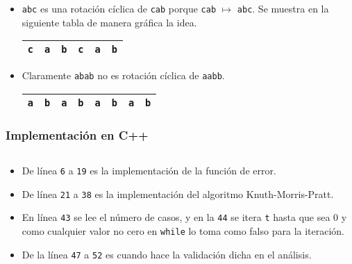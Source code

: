 \begin{itemize}
\item \texttt{abc} es una rotación cíclica de \texttt{cab} porque \texttt{cab} $\mapsto$
\texttt{abc}. Se muestra en la siguiente tabla de manera gráfica la idea.
\begin{table}[h]
\centering
\begin{tabular}{|c|c|c|c|c|c|}
\hline
\texttt{c}                   &  \cellcolor{green}\texttt{a} &  \cellcolor{green}\texttt{b} &
\cellcolor{green} \texttt{c} &  \texttt{a}                  & \texttt{b}                   \\\hline
\end{tabular}
\end{table}

\item Claramente \texttt{abab} no es rotación cíclica de \texttt{aabb}.
\begin{table}[h]
\centering
\begin{tabular}{|c|c|c|c|c|c|c|c|}
\hline
\texttt{a} & \texttt{b} & \texttt{a} &\texttt{b} & \texttt{a} & \texttt{b} & \texttt{a} & \texttt{b} \\\hline
\end{tabular}
\end{table}
\end{itemize}



\subsubsection{Implementación en C++}
\inputminted[linenos, frame=lines, fontsize=\footnotesize]{cpp}{problemas/cpp/EC_WORLD.cpp}
\begin{itemize}
\item De línea \texttt{6} a \texttt{19} es la implementación de la función de error.

\item De línea \texttt{21} a \texttt{38} es la implementación del algoritmo Knuth-Morris-Pratt.

\item En línea \texttt{43} se lee el número de casos, y en la \texttt{44} se itera \texttt{t} hasta
que sea 0 y como cualquier valor no cero en \texttt{while} lo toma como falso para la iteración.

\item De la línea \texttt{47} a \texttt{52} es cuando hace la validación dicha en el análisis.

\end{itemize}

